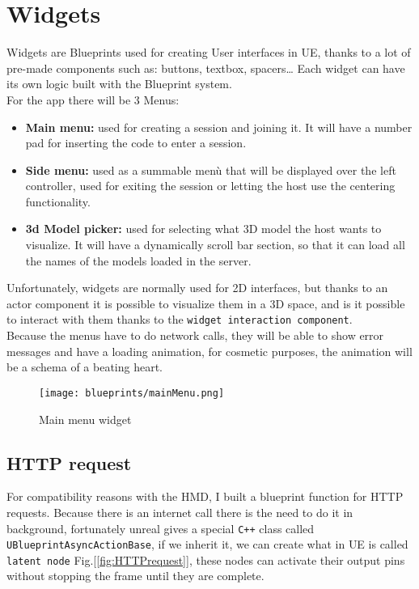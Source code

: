 \section{Widgets}
\label{sec:widgets}
\noindent
Widgets are Blueprints used for creating User interfaces in \ac{UE}, thanks to a lot of pre-made components such as: buttons, textbox, spacers… Each widget can have its own logic built with the Blueprint system.\\
For the app there will be 3 Menus:
\begin{itemize}
    \item \textbf{Main menu:} used for creating a session and joining it. It will have a number pad for inserting the code to enter a session.
    \item \textbf{Side menu:} used as a summable menù that will be displayed over the left controller, used for exiting the session or letting the host use the centering functionality.
    \item \textbf{3d Model picker:} used for selecting what 3D model the host wants to visualize. It will have a dynamically scroll bar section, so that it can load all the names of the models loaded in the server. 
\end{itemize}
\noindent
Unfortunately, widgets are normally used for 2D interfaces, but thanks to an actor component it is possible to visualize them in a 3D space, and is it possible to interact with them thanks to the \texttt{widget interaction component}.\\
Because the menus have to do network calls, they will be able to show error messages and have a loading animation, for cosmetic purposes, the animation will be a schema of a beating heart.


\begin{figure}[ht]
    \centering
    \texttt{[image: blueprints/mainMenu.png]}
    \caption{Main menu widget}
    \label{fig:mainMenu}
\end{figure}

\subsection{HTTP request}
\noindent
For compatibility reasons with the \ac{HMD}, I built a blueprint function for \ac{HTTP} requests.
Because there is an internet call there is the need to do it in background, fortunately unreal gives a special \texttt{C++} class called \texttt{UBlueprintAsyncActionBase},
if we inherit it, we can create what in \ac{UE} is called \texttt{latent node} Fig.[\ref{fig:HTTPrequest}], these nodes can activate their output pins without stopping the frame until they are complete. 

